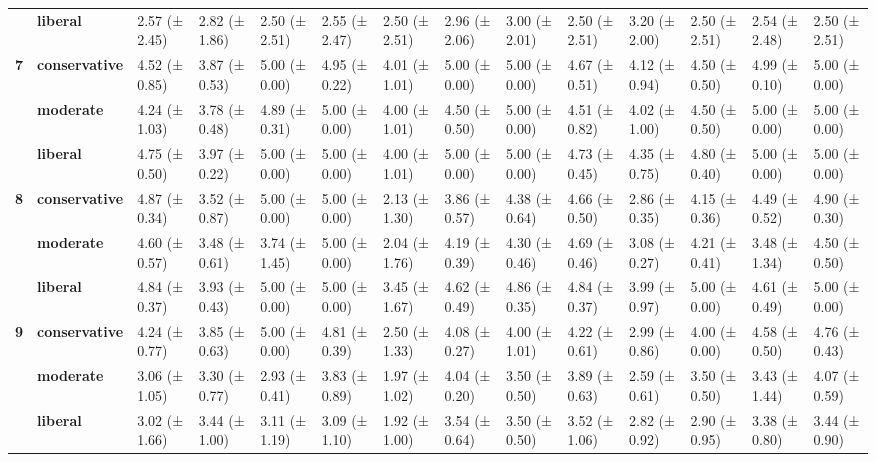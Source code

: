 \begin{longtable}{llllllllllllll}
\textbf{} & \textbf{liberal} & 2.57 (± 2.45) & 2.82 (± 1.86) & 2.50 (± 2.51) & 2.55 (± 2.47) & 2.50 (± 2.51) & 2.96 (± 2.06) & 3.00 (± 2.01) & 2.50 (± 2.51) & 3.20 (± 2.00) & 2.50 (± 2.51) & 2.54 (± 2.48) & 2.50 (± 2.51) \\
\cline{1-14}
\multirow[t]{3}{*}{\textbf{7}} & \textbf{conservative} & 4.52 (± 0.85) & 3.87 (± 0.53) & 5.00 (± 0.00) & 4.95 (± 0.22) & 4.01 (± 1.01) & 5.00 (± 0.00) & 5.00 (± 0.00) & 4.67 (± 0.51) & 4.12 (± 0.94) & 4.50 (± 0.50) & 4.99 (± 0.10) & 5.00 (± 0.00) \\
\textbf{} & \textbf{moderate} & 4.24 (± 1.03) & 3.78 (± 0.48) & 4.89 (± 0.31) & 5.00 (± 0.00) & 4.00 (± 1.01) & 4.50 (± 0.50) & 5.00 (± 0.00) & 4.51 (± 0.82) & 4.02 (± 1.00) & 4.50 (± 0.50) & 5.00 (± 0.00) & 5.00 (± 0.00) \\
\textbf{} & \textbf{liberal} & 4.75 (± 0.50) & 3.97 (± 0.22) & 5.00 (± 0.00) & 5.00 (± 0.00) & 4.00 (± 1.01) & 5.00 (± 0.00) & 5.00 (± 0.00) & 4.73 (± 0.45) & 4.35 (± 0.75) & 4.80 (± 0.40) & 5.00 (± 0.00) & 5.00 (± 0.00) \\
\cline{1-14}
\multirow[t]{3}{*}{\textbf{8}} & \textbf{conservative} & 4.87 (± 0.34) & 3.52 (± 0.87) & 5.00 (± 0.00) & 5.00 (± 0.00) & 2.13 (± 1.30) & 3.86 (± 0.57) & 4.38 (± 0.64) & 4.66 (± 0.50) & 2.86 (± 0.35) & 4.15 (± 0.36) & 4.49 (± 0.52) & 4.90 (± 0.30) \\
\textbf{} & \textbf{moderate} & 4.60 (± 0.57) & 3.48 (± 0.61) & 3.74 (± 1.45) & 5.00 (± 0.00) & 2.04 (± 1.76) & 4.19 (± 0.39) & 4.30 (± 0.46) & 4.69 (± 0.46) & 3.08 (± 0.27) & 4.21 (± 0.41) & 3.48 (± 1.34) & 4.50 (± 0.50) \\
\textbf{} & \textbf{liberal} & 4.84 (± 0.37) & 3.93 (± 0.43) & 5.00 (± 0.00) & 5.00 (± 0.00) & 3.45 (± 1.67) & 4.62 (± 0.49) & 4.86 (± 0.35) & 4.84 (± 0.37) & 3.99 (± 0.97) & 5.00 (± 0.00) & 4.61 (± 0.49) & 5.00 (± 0.00) \\
\cline{1-14}
\multirow[t]{3}{*}{\textbf{9}} & \textbf{conservative} & 4.24 (± 0.77) & 3.85 (± 0.63) & 5.00 (± 0.00) & 4.81 (± 0.39) & 2.50 (± 1.33) & 4.08 (± 0.27) & 4.00 (± 1.01) & 4.22 (± 0.61) & 2.99 (± 0.86) & 4.00 (± 0.00) & 4.58 (± 0.50) & 4.76 (± 0.43) \\
\textbf{} & \textbf{moderate} & 3.06 (± 1.05) & 3.30 (± 0.77) & 2.93 (± 0.41) & 3.83 (± 0.89) & 1.97 (± 1.02) & 4.04 (± 0.20) & 3.50 (± 0.50) & 3.89 (± 0.63) & 2.59 (± 0.61) & 3.50 (± 0.50) & 3.43 (± 1.44) & 4.07 (± 0.59) \\
\textbf{} & \textbf{liberal} & 3.02 (± 1.66) & 3.44 (± 1.00) & 3.11 (± 1.19) & 3.09 (± 1.10) & 1.92 (± 1.00) & 3.54 (± 0.64) & 3.50 (± 0.50) & 3.52 (± 1.06) & 2.82 (± 0.92) & 2.90 (± 0.95) & 3.38 (± 0.80) & 3.44 (± 0.90) \\

\end{longtable}
